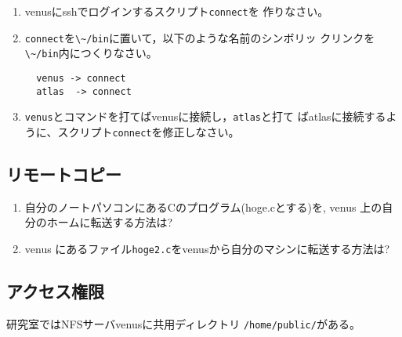 \documentclass[11pt, twocolumn, ]{jsarticle}
\begin{document}
\begin{enumerate}
\item
  venusにsshでログインするスクリプト\passthrough{\lstinline!connect!}を
  作りなさい。
\item
  \passthrough{\lstinline!connect!}を\passthrough{\lstinline!\~/bin!}に置いて，以下のような名前のシンボリッ
  クリンクを\passthrough{\lstinline!\~/bin!}内につくりなさい。

\begin{lstlisting}
  venus -> connect
  atlas  -> connect
\end{lstlisting}
\item
  \passthrough{\lstinline!venus!}とコマンドを打てばvenusに接続し，\passthrough{\lstinline!atlas!}と打て
  ばatlasに接続するように、スクリプト\passthrough{\lstinline!connect!}を修正しなさい。
\end{enumerate}

\hypertarget{ux30eaux30e2ux30fcux30c8ux30b3ux30d4ux30fc}{%
\subsection{リモートコピー}\label{ux30eaux30e2ux30fcux30c8ux30b3ux30d4ux30fc}}

\begin{enumerate}
\item
  自分のノートパソコンにあるCのプログラム(hoge.cとする)を, venus
  上の自分のホームに転送する方法は?
\item
  venus
  にあるファイル\passthrough{\lstinline!hoge2.c!}をvenusから自分のマシンに転送する方法は?
\end{enumerate}

\hypertarget{ux30a2ux30afux30bbux30b9ux6a29ux9650}{%
\subsection{アクセス権限}\label{ux30a2ux30afux30bbux30b9ux6a29ux9650}}

研究室ではNFSサーバvenusに共用ディレクトリ
\passthrough{\lstinline!/home/public/!}がある。
\end{document}
